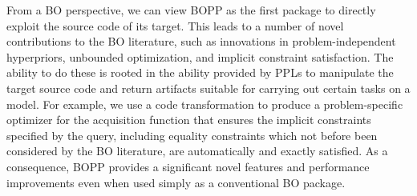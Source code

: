 From a BO perspective, we can view BOPP as the first package to directly exploit the source code of its target.
This leads to a number of novel contributions to the BO literature, such as innovations in 
problem-independent hyperpriors, unbounded optimization, and implicit constraint satisfaction.  
The ability to do these is rooted
in the ability provided by PPLs to manipulate the target source code and return artifacts suitable for carrying
out certain tasks on a model.  For example, we use a code transformation to produce a problem-specific
optimizer for the acquisition function that ensures the implicit constraints specified by the query,
including equality constraints which not before been considered by the BO literature, are automatically and exactly
satisfied.  As a consequence, BOPP provides a significant novel features and performance
improvements even when used simply as a conventional BO package.